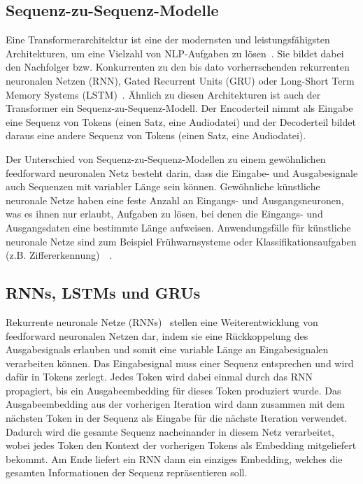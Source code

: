\subsection{Sequenz-zu-Sequenz-Modelle}

Eine Transformerarchitektur ist eine der modernsten und leistungsfähigsten Architekturen, um eine Vielzahl von NLP-Aufgaben zu lösen~\cite{patwardhan2023}.
Sie bildet dabei den Nachfolger bzw. Konkurrenten zu den bis dato vorherrschenden rekurrenten neuronalen Netzen (RNN), Gated Recurrent Units (GRU) oder Long-Short Term Memory Systems (LSTM)~\cite{hochreiter1997}.
Ähnlich zu diesen Architekturen ist auch der Transformer ein Sequenz-zu-Sequenz-Modell.
Der Encoderteil nimmt als Eingabe eine Sequenz von Tokens (einen Satz, eine Audiodatei) und der Decoderteil bildet daraus eine andere Sequenz von Tokens (einen Satz, eine Audiodatei).

Der Unterschied von Sequenz-zu-Sequenz-Modellen zu einem gewöhnlichen feedforward neuronalen Netz besteht darin, dass die Eingabe- und Ausgabesignale auch Sequenzen mit variabler Länge sein können.
Gewöhnliche künstliche neuronale Netze haben eine feste Anzahl an Eingangs- und Ausgangsneuronen, was es ihnen nur erlaubt, Aufgaben zu lösen, bei denen die Eingangs- und Ausgangsdaten eine bestimmte Länge aufweisen.
Anwendungsfälle für künstliche neuronale Netze sind zum Beispiel Frühwarnsysteme oder Klassifikationsaufgaben (z.B. Ziffererkennung)~\cite{duncan2013}~\cite{lee1991}.

\subsection{RNNs, LSTMs und GRUs}

Rekurrente neuronale Netze (RNNs)~\cite{dafontouracosta1996} stellen eine Weiterentwicklung von feedforward neuronalen Netzen dar, indem sie eine Rückkoppelung des Ausgabesignals erlauben und somit eine variable Länge an Eingabesignalen verarbeiten können.
Das Eingabesignal muss einer Sequenz entsprechen und wird dafür in Tokens zerlegt.
Jedes Token wird dabei einmal durch das RNN propagiert, bis ein Ausgabeembedding für dieses Token produziert wurde.
Das Ausgabeembedding aus der vorherigen Iteration wird dann zusammen mit dem nächsten Token in der Sequenz als Eingabe für die nächste Iteration verwendet.
Dadurch wird die gesamte Sequenz nacheinander in diesem Netz verarbeitet, wobei jedes Token den Kontext der vorherigen Tokens als Embedding mitgeliefert bekommt.
Am Ende liefert ein RNN dann ein einziges Embedding, welches die gesamten Informationen der Sequenz repräsentieren soll.

